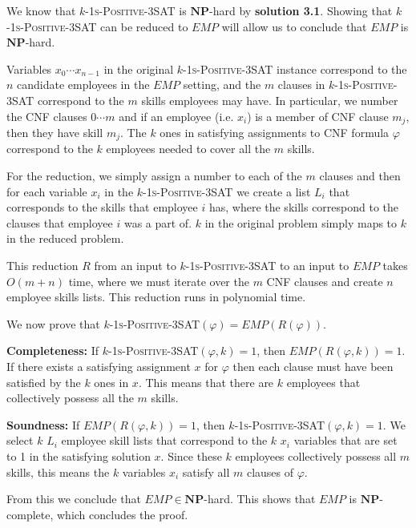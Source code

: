 \documentclass[11pt]{article}
\begin{document}
We know that \textsc{$k$-1s-Positive-3SAT} is $\mathbf{NP}$-hard by \textbf{solution 3.1}. Showing that \textsc{$k$-1s-Positive-3SAT} can be reduced to $EMP$ will allow us to conclude that $EMP$ is $\mathbf{NP}$-hard.

Variables $x_0 \cdots x_{n-1}$ in the original \textsc{$k$-1s-Positive-3SAT} instance correspond to the $n$ candidate employees in the $EMP$ setting, and the $m$ clauses in \textsc{$k$-1s-Positive-3SAT} correspond to the $m$ skills employees may have. In particular, we number the CNF clauses $0 \cdots m$ and if an employee (i.e. $x_i$) is a member of CNF clause $m_j$, then they have skill $m_j$. The $k$ ones in satisfying assignments to CNF formula $\varphi$ correspond to the $k$ employees needed to cover all the $m$ skills.

For the reduction, we simply assign a number to each of the $m$ clauses and then for each variable $x_i$ in the \textsc{$k$-1s-Positive-3SAT} we create a list $L_i$ that corresponds to the skills that employee $i$ has, where the skills correspond to the clauses that employee $i$ was a part of. $k$ in the original problem simply maps to $k$ in the reduced problem.

This reduction $R$ from an input to \textsc{$k$-1s-Positive-3SAT} to an input to $EMP$ takes $O(m + n)$ time, where we must iterate over the $m$ CNF clauses and create $n$ employee skills lists. This reduction runs in polynomial time.

We now prove that \textsc{$k$-1s-Positive-3SAT}$(\varphi) = EMP(R(\varphi))$.

\textbf{Completeness:} If \textsc{$k$-1s-Positive-3SAT}$(\varphi, k) = 1$, then $EMP(R(\varphi, k)) = 1$. If there exists a satisfying assignment $x$ for $\varphi$ then each clause must have been satisfied by the $k$ ones in $x$. This means that there are $k$ employees that collectively possess all the $m$ skills.

\textbf{Soundness:} If $EMP(R(\varphi, k)) = 1$, then \textsc{$k$-1s-Positive-3SAT}$(\varphi, k) = 1$. We select $k$ $L_i$ employee skill lists that correspond to the $k$ $x_i$ variables that are set to 1 in the satisfying solution $x$. Since these $k$ employees collectively possess all $m$ skills, this means the $k$ variables $x_i$ satisfy all $m$ clauses of $\varphi$. 

From this we conclude that $EMP \in \mathbf{NP}$-hard. This shows that $EMP$ is \(\mathbf{NP}\)-complete, which concludes the proof.

\newpage
\end{document}

